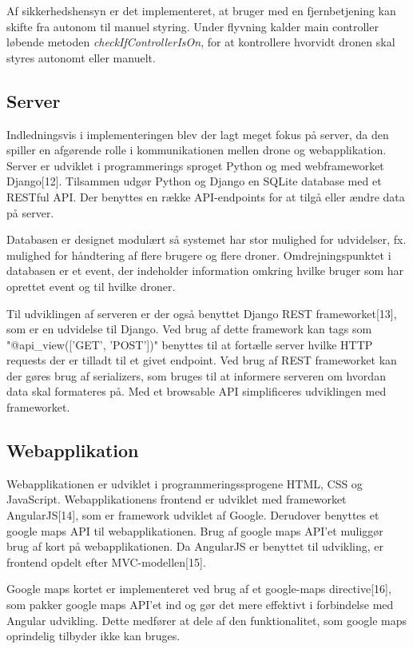 Af sikkerhedshensyn er det implementeret, at bruger med en fjernbetjening kan skifte fra autonom til manuel styring. Under flyvning kalder main controller løbende metoden \textit{checkIfControllerIsOn}, for at kontrollere hvorvidt dronen skal styres autonomt eller manuelt.  

\subsection{Server}
Indledningsvis i implementeringen blev der lagt meget fokus på server, da den spiller en afgørende rolle i kommunikationen mellen drone og webapplikation. 
Server er udviklet i programmerings sproget Python og med webframeworket Django[12].
Tilsammen udgør Python og Django en SQLite database med et RESTful API. Der benyttes en række API-endpoints for at tilgå eller ændre data på server.

Databasen er designet modulært så systemet har stor mulighed for udvidelser, fx. mulighed for håndtering af flere brugere og flere droner. Omdrejningspunktet i databasen er et event, der indeholder information omkring hvilke bruger som har oprettet event og til hvilke droner.

Til udviklingen af serveren er der også benyttet Django REST frameworket[13], som er en udvidelse til Django. Ved brug af dette framework kan tags som "@api\_view(['GET', 'POST'])" benyttes til at fortælle server hvilke HTTP requests der er tilladt til et givet endpoint. 
Ved brug af REST frameworket kan der gøres brug af serializers, som bruges til at informere  serveren om hvordan data skal formateres på. Med et browsable API simplificeres udviklingen med frameworket.

\newpage
\subsection{Webapplikation}
Webapplikationen  er udviklet i programmeringssprogene HTML, CSS og JavaScript. Webapplikationens frontend er udviklet med frameworket AngularJS[14], som er framework udviklet af Google. Derudover benyttes et google maps API til webapplikationen. Brug af google maps API'et muliggør brug af kort på webapplikationen. Da AngularJS er benyttet til udvikling, er frontend opdelt efter MVC-modellen[15]. 

Google maps kortet er implementeret ved brug af et google-maps directive[16], som pakker google maps API'et ind og gør det mere effektivt i forbindelse med Angular udvikling. Dette medfører at dele af den funktionalitet, som google maps oprindelig tilbyder ikke kan bruges. 

